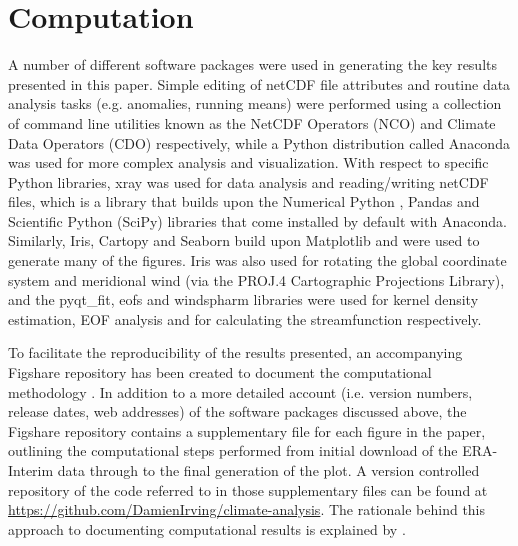 \section{Computation}

A number of different software packages were used in generating the key results presented in this paper. Simple editing of netCDF file attributes and routine data analysis tasks (e.g. anomalies, running means) were performed using a collection of command line utilities known as the NetCDF Operators (NCO) and Climate Data Operators (CDO) respectively, while a Python distribution called Anaconda was used for more complex analysis and visualization. With respect to specific Python libraries, xray was used for data analysis and reading/writing netCDF files, which is a library that builds upon the Numerical Python \citep[NumPy;][]{VanDerWalt2011}, Pandas and Scientific Python (SciPy) libraries that come installed by default with Anaconda. Similarly, Iris, Cartopy and Seaborn build upon Matplotlib \citep[the default Python plotting library;][]{Hunter2007} and were used to generate many of the figures. Iris was also used for rotating the global coordinate system and meridional wind (via the PROJ.4 Cartographic Projections Library), and the pyqt\_fit, eofs and windspharm libraries were used for kernel density estimation, EOF analysis and for calculating the streamfunction respectively.

To facilitate the reproducibility of the results presented, an accompanying Figshare repository has been created to document the computational methodology \citep{Irving2016a}. In addition to a more detailed account (i.e. version numbers, release dates, web addresses) of the software packages discussed above, the Figshare repository contains a supplementary file for each figure in the paper, outlining the computational steps performed from initial download of the ERA-Interim data through to the final generation of the plot. A version controlled repository of the code referred to in those supplementary files can be found at \url{https://github.com/DamienIrving/climate-analysis}. The rationale behind this approach to documenting computational results is explained by \citet{Irving2016}.
